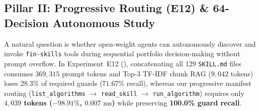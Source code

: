 \subsection{Pillar II: Progressive Routing (E12) \& 64-Decision Autonomous Study}
\label{sec:autonomous_pillar}

A natural question is whether open-weight agents can autonomously discover and invoke \texttt{fin-skills} tools during sequential portfolio decision-making without prompt overflow. In Experiment~E12 (), concatenating all 129 \texttt{SKILL.md} files consumes $369{,}315$ prompt tokens and Top-3 TF-IDF chunk RAG ($9{,}042$ tokens) loses $28.3\%$ of required guards ($71.67\%$ recall), whereas our progressive manifest routing (\texttt{list\_algorithms} $\to$ \texttt{read\_skill} $\to$ \texttt{run\_algorithm}) requires only \textbf{$4{,}039$ tokens ($-98.91\%$, $0.007\text{ ms}$)} while preserving \textbf{100.0\% guard recall}.

\begin{table}[t]
\centering
{}
\vspace{-0.15cm}
\caption{64-decision autonomous portfolio study on 2025 ECB FX reference rates (\texttt{USD, JPY, GBP, CHF}; 5 bps cost, seeds 11 \& 23, Appendix~\ref{app:autonomous}). Progressive discovery achieves $64/64$ valid allocations and $43/43$ successful tool calls ($13$ by 7B, $30$ by 14B), while showing that price-only technical algorithms do not generate positive alpha over passive controls.}
\label{tab:autonomous}
\vspace{-0.22cm}
\end{table}

